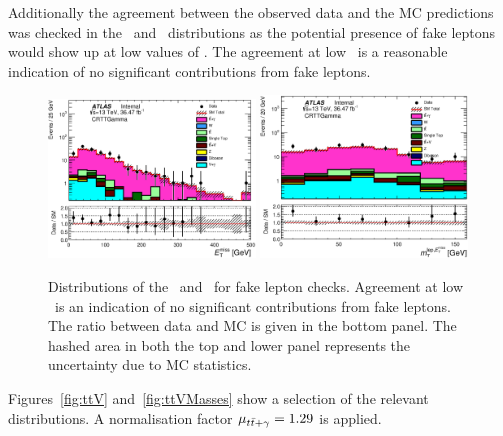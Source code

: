 		Additionally the agreement between the observed data and the \ac{MC} predictions was checked in the \met\ and \mtlepmet\ distributions as the potential presence of fake leptons would show up at low values of \mtlepmet. The agreement at low \mtlepmet\ is a reasonable indication of no significant contributions from fake leptons.

		\begin{figure}[htbp]
			\begin{center}
				\includegraphics[width=0.49\textwidth]{figures/stop/ttGamma/Met_CRTTGamma_withRatio_log.eps}
				\includegraphics[width=0.49\textwidth]{figures/stop/ttGamma/MtMetLep_CRTTGamma_withRatio_log.eps}
				\caption{\label{fig:ttVFakeLepCheck} Distributions of the \met\ and \mtlepmet\ for fake lepton checks. Agreement at low \mtlepmet\ is an indication of no significant contributions from fake leptons. The ratio between data and \ac{MC} is given in the bottom panel. The hashed area in both the top and lower panel represents the uncertainty due to \ac{MC} statistics.}
			\end{center}
		\end{figure}



		Figures~\ref{fig:ttV} and~\ref{fig:ttVMasses} show a selection of the relevant distributions. A normalisation factor $\mu_{t\bar{t}+\gamma} = 1.29$ is applied.

